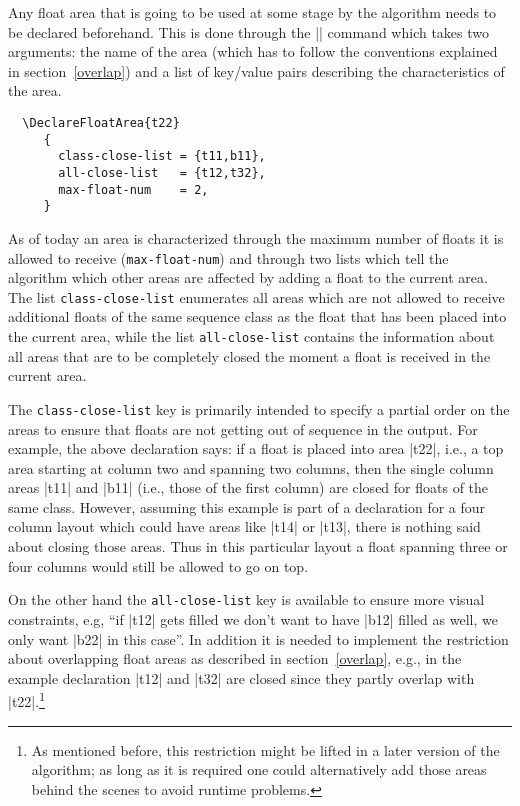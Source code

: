\documentclass[twocolumn]{article}
\begin{document}
Any float area that is going to be used at some stage by the algorithm
needs to be declared beforehand. This is done through the
|\DeclareFloatArea| command which takes two arguments: the name of the
area (which has to follow the conventions explained in
section~\vref{overlap}) and a list of key/value pairs describing the
characteristics of the area.
\begin{verbatim}
  \DeclareFloatArea{t22}
     {
       class-close-list = {t11,b11},
       all-close-list   = {t12,t32},
       max-float-num    = 2,
     }
\end{verbatim}
 As of today an area is characterized through the maximum number of
floats it is allowed to receive (\texttt{max-float-num}) and through
two lists which tell the algorithm which other areas are affected by
adding a float to the current area. The list \texttt{class-close-list}
enumerates all areas which are not allowed to receive additional
floats of the same sequence class as the float that has been placed 
into the current area, while
the list \texttt{all-close-list} contains the information about all
areas that are to be completely closed the moment a float is received
in the current area.

The \texttt{class-close-list} key is primarily intended to specify a
partial order on the areas to ensure that floats are not getting out
of sequence in the output. For example, the above declaration says: if
a float is placed into area |t22|, i.e., a top area starting at column
two and spanning two columns, then the single column areas |t11| and
|b11| (i.e., those of the first column) are closed for floats of the
same class. However, assuming this example is part of a declaration for
a four column layout which could have areas like |t14| or |t13|, there
is nothing said about closing those areas. Thus in this particular
layout a float spanning three or four columns would still be allowed
to go on top.

On the other hand the \texttt{all-close-list} key is available to
ensure more visual constraints, e.g, ``if |t12| gets filled we don't
want to have |b12| filled as well, we only want |b22| in this
case''. In addition it is needed to implement the restriction about
overlapping float areas as described in section~\vref{overlap}, e.g.,
in the example declaration |t12| and |t32| are closed since they
partly overlap with |t22|.\footnote{As mentioned before, this
restriction might be lifted in a later version of the algorithm; as
long as it is required one could alternatively add those areas behind
the scenes to avoid runtime problems.}
\end{document}
